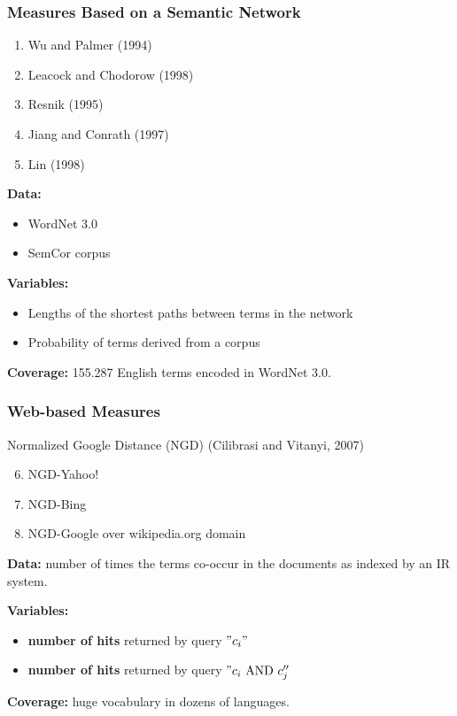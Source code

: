 \documentclass{beamer}
\begin{document}
\begin{frame}
\frametitle{Measures Based on a Semantic Network}

\begin{enumerate}
  \item Wu and Palmer (1994)
 \item Leacock and Chodorow (1998)
 \item Resnik (1995)
 \item Jiang and Conrath (1997)
 \item Lin (1998)
\end{enumerate}


 \textbf{Data:} 
 \begin{itemize}
   \item WordNet 3.0
   \item SemCor corpus
	
 \end{itemize}
 \textbf{Variables:}
 \begin{itemize}
  \item Lengths of the shortest paths between terms in the network
 \item Probability of terms derived from a corpus
 \end{itemize}
 
 \textbf{Coverage:} 155.287 English terms encoded in WordNet 3.0.
 
\end{frame}

\begin{frame}
\frametitle{Web-based Measures}
	
Normalized Google Distance (NGD) (Cilibrasi and Vitanyi, 2007)

\begin{enumerate}
   \setcounter{enumi}{5}
   \item NGD-Yahoo! 
   \item NGD-Bing 
   \item NGD-Google over wikipedia.org domain     
\end{enumerate}

\textbf{Data:} number of times the terms co-occur in the documents
as indexed by an IR system.

\textbf{Variables:} 

\begin{itemize}
	\item \textbf{number of hits} returned by query $"c_i"$ 
	\item \textbf{number of hits} returned by query $"c_i \text{ AND } c_j''$
\end{itemize}

\textbf{Coverage:} huge vocabulary in dozens of languages.


\end{frame}
\end{document}
